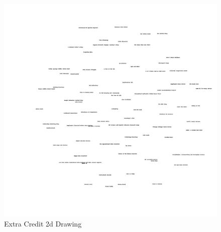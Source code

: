\documentclass[11pt]{scrartcl} %
\begin{document}
    \begin{figure}[p]%
        \includegraphics[width=.99\textwidth,height=.99\textheight]{../Figures/blogs2dExtra.jpg}%
        \caption{Extra Credit 2d Drawing}
    \end{figure}%
\end{document}

